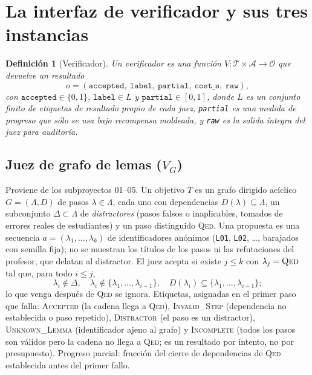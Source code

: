 \documentclass[11pt,a4paper]{article}
\newtheorem{definition}{Definición}
\begin{document}
\section{La interfaz de verificador y sus tres instancias}

\begin{definition}[Verificador]
Un verificador es una función $V : \mathcal{T} \times \mathcal{A} \to \mathcal{O}$ que devuelve un \emph{resultado}
\[
  o = (\texttt{accepted},\ \texttt{label},\ \texttt{partial},\ \texttt{cost\_s},\ \texttt{raw}),
\]
con $\texttt{accepted}\in\{0,1\}$, $\texttt{label}\in L$ y $\texttt{partial}\in[0,1]$,
donde $L$ es un conjunto finito de etiquetas de resultado propio de cada juez, \texttt{partial} es una medida de progreso que sólo se usa bajo recompensa moldeada, y \texttt{raw} es la salida íntegra del juez para auditoría.
\end{definition}

\subsection{Juez de grafo de lemas ($V_G$)}

Proviene de los subproyectos 01--05. Un objetivo $T$ es un grafo dirigido acíclico $G = (\Lambda, D)$ de pasos $\lambda \in \Lambda$, cada uno con dependencias $D(\lambda) \subseteq \Lambda$, un subconjunto $\Delta \subset \Lambda$ de \emph{distractores} (pasos falsos o inaplicables, tomados de errores reales de estudiantes) y un paso distinguido \textsc{Qed}. Una propuesta es una secuencia $a = (\lambda_1, \dots, \lambda_k)$ de identificadores anónimos (\texttt{L01}, \texttt{L02}, \dots, barajados con semilla fija); no se muestran los títulos de los pasos ni las refutaciones del profesor, que delatan al distractor. El juez acepta si existe $j \le k$ con $\lambda_j = \textsc{Qed}$ tal que, para todo $i \le j$,
\[
  \lambda_i \notin \Delta,\quad \lambda_i \notin \{\lambda_1,\dots,\lambda_{i-1}\},\quad D(\lambda_i) \subseteq \{\lambda_1,\dots,\lambda_{i-1}\};
\]
lo que venga después de \textsc{Qed} se ignora. Etiquetas, asignadas en el primer paso que falla: \textsc{Accepted} (la cadena llega a \textsc{Qed}), \textsc{Invalid\_Step} (dependencia no establecida o paso repetido), \textsc{Distractor} (el paso es un distractor), \textsc{Unknown\_Lemma} (identificador ajeno al grafo) y \textsc{Incomplete} (todos los pasos son válidos pero la cadena no llega a \textsc{Qed}; es un resultado por intento, no por presupuesto). Progreso parcial: fracción del cierre de dependencias de \textsc{Qed} establecida antes del primer fallo.
\end{document}
